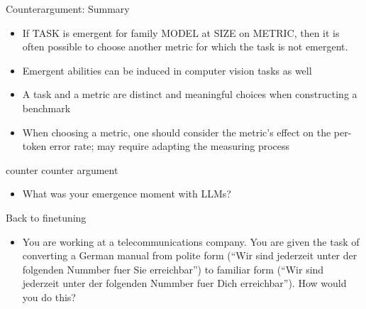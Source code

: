 
\begin{vbframe}{Counterargument: Summary}

\vfill

%
\begin{itemize}
%
\item
If TASK is emergent for family MODEL at SIZE on METRIC, then
it is often possible to choose another metric for which the
task is not emergent.
%
\item Emergent abilities can be induced in computer vision tasks as well
%
\item A task and a metric are distinct and meaningful choices when constructing a benchmark
%
\item When choosing a metric, one should consider the
metric's effect on the per-token error rate;
may require adapting the measuring process
%
\end{itemize}


\vfill

\end{vbframe}



\begin{vbframe}{counter counter argument}

\vfill

%
\begin{itemize}
\item \ques What was your emergence moment with LLMs?

%
\end{itemize}


\vfill

\end{vbframe}

\begin{vbframe}{Back to finetuning}

\vfill

%
\begin{itemize}
\item \ques You are working at a telecommunications
company. You are given the task of converting a German manual from
polite form (``Wir sind jederzeit unter der folgenden
Nummber fuer Sie erreichbar'') to familiar form
(``Wir sind jederzeit unter der folgenden
Nummber fuer Dich erreichbar''). How would you do this?

\end{itemize}


\vfill

\end{vbframe}


